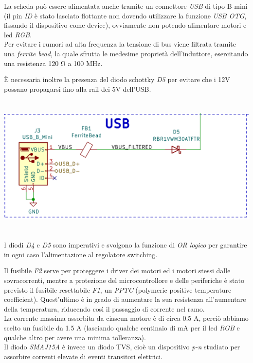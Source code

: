 La scheda può essere alimentata anche tramite un connettore \emph{USB}
di tipo B-mini (il pin \emph{ID} è stato lasciato flottante non dovendo
utilizzare la funzione \emph{USB OTG}, fissando il dispositivo come
device), ovviamente non potendo alimentare motori e led \emph{RGB}.\\
Per evitare i rumori ad alta frequenza la tensione di bus viene filtrata
tramite una \emph{ferrite bead}, la quale sfrutta le medesime proprietà
dell'induttore, esercitando una resistenza 120 Ω a 100 MHz.

È necessaria inoltre la presenza del diodo schottky \emph{D5} per
evitare che i 12V possano propagarsi fino alla rail dei 5V dell'USB.

\begin{center}
\includegraphics[width=6.5in,height=2.80556in]{figures/image60.png}
\captionsetup{type=figure}
\end{center}

I diodi \emph{D4} e \emph{D5} sono imperativi e svolgono la funzione di
\emph{OR logico} per garantire in ogni caso l'alimentazione al
regolatore switching.

Il fusibile \emph{F2} serve per proteggere i driver dei motori ed i
motori stessi dalle sovracorrenti, mentre a protezione del
microcontrollore e delle periferiche è stato previsto il fusibile
resettabile \emph{F1}, un \emph{PPTC} (polymeric positive temperature
coefficient). Quest'ultimo è in grado di aumentare la sua resistenza
all'aumentare della temperatura, riducendo così il passaggio di corrente
nel ramo.\\
La corrente massima assorbita da ciascun motore è di circa 0.5 A, perciò
abbiamo scelto un fusibile da 1.5 A (lasciando qualche centinaio di mA
per il led \emph{RGB} e qualche altro per avere una minima
tolleranza).\\
Il diodo \emph{SMAJ15A} è invece un diodo TVS, cioè un dispositivo
\emph{p-n} studiato per assorbire correnti elevate di eventi transitori
elettrici.

